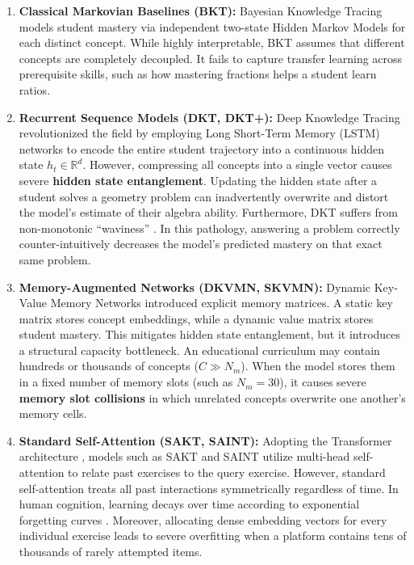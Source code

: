 \documentclass[11pt]{article}
\begin{document}
\begin{enumerate}
    \item \textbf{Classical Markovian Baselines (BKT):} Bayesian Knowledge Tracing \citep{corbett1994knowledge} models student mastery via independent two-state Hidden Markov Models for each distinct concept. While highly interpretable, BKT assumes that different concepts are completely decoupled. It fails to capture transfer learning across prerequisite skills, such as how mastering fractions helps a student learn ratios.
    \item \textbf{Recurrent Sequence Models (DKT, DKT+):} Deep Knowledge Tracing \citep{piech2015deep} revolutionized the field by employing Long Short-Term Memory (LSTM) networks to encode the entire student trajectory into a continuous hidden state $h_t \in \mathbb{R}^d$. However, compressing all concepts into a single vector causes severe \textbf{hidden state entanglement}. Updating the hidden state after a student solves a geometry problem can inadvertently overwrite and distort the model's estimate of their algebra ability. Furthermore, DKT suffers from non-monotonic ``waviness'' \citep{yeung2018addressing}. In this pathology, answering a problem correctly counter-intuitively decreases the model's predicted mastery on that exact same problem.
    \item \textbf{Memory-Augmented Networks (DKVMN, SKVMN):} Dynamic Key-Value Memory Networks \citep{zhang2017dynamic} introduced explicit memory matrices. A static key matrix stores concept embeddings, while a dynamic value matrix stores student mastery. This mitigates hidden state entanglement, but it introduces a structural capacity bottleneck. An educational curriculum may contain hundreds or thousands of concepts ($C \gg N_m$). When the model stores them in a fixed number of memory slots (such as $N_m = 30$), it causes severe \textbf{memory slot collisions} in which unrelated concepts overwrite one another's memory cells.
    \item \textbf{Standard Self-Attention (SAKT, SAINT):} Adopting the Transformer architecture \citep{vaswani2017attention}, models such as SAKT \citep{pandey2019self} and SAINT \citep{choi2020towards} utilize multi-head self-attention to relate past exercises to the query exercise. However, standard self-attention treats all past interactions symmetrically regardless of time. In human cognition, learning decays over time according to exponential forgetting curves \citep{ebbinghaus1885memory}. Moreover, allocating dense embedding vectors for every individual exercise leads to severe overfitting when a platform contains tens of thousands of rarely attempted items.
\end{enumerate}
\end{document}
